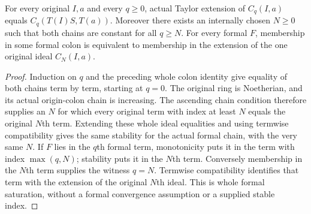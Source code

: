 \begin{theorem}
\label{hir:actual-formal-extension-whole-colon-saturation}
\leanok
For every original $I,a$ and every $q\geq0$, actual Taylor extension of
$C_q(I,a)$ equals $C_q(T(I)S,T(a))$. Moreover there exists an internally
chosen $N\geq0$ such that both chains are constant for all $q\geq N$.
For every formal $F$, membership in some formal colon is equivalent to
membership in the extension of the one original ideal $C_N(I,a)$.
\end{theorem}
\begin{proof}
Induction on $q$ and the preceding whole colon identity give equality of
both chains term by term, starting at $q=0$. The original ring is Noetherian,
and its actual origin-colon chain is increasing. The ascending chain
condition therefore supplies an $N$ for which every original term with
index at least $N$ equals the original $N$th term. Extending these whole
ideal equalities and using termwise compatibility gives the same stability
for the actual formal chain, with the very same $N$. If $F$ lies in the
$q$th formal term, monotonicity puts it in the term with index $\max(q,N)$;
stability puts it in the $N$th term. Conversely membership in the $N$th
term supplies the witness $q=N$. Termwise compatibility identifies that
term with the extension of the original $N$th ideal. This is whole formal
saturation, without a formal convergence assumption or a supplied stable index.
\end{proof}
